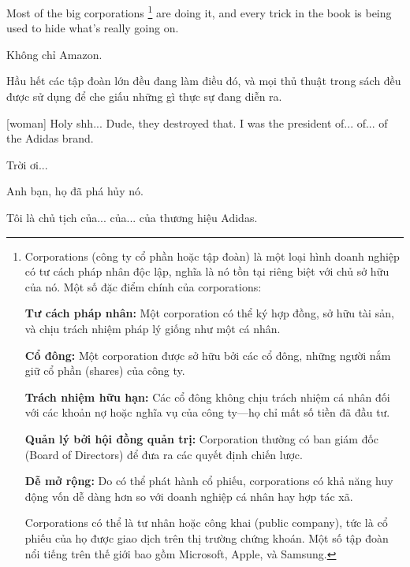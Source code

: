 \documentclass[a4paper]{article}
\begin{document}
	Most of the big corporations  \footnote{
		Corporations (công ty cổ phần hoặc tập đoàn) là một loại hình doanh nghiệp có tư cách pháp nhân độc lập, nghĩa là nó tồn tại riêng biệt với chủ sở hữu của nó. Một số đặc điểm chính của corporations:
		
		\textbf{Tư cách pháp nhân:} Một corporation có thể ký hợp đồng, sở hữu tài sản, và chịu trách nhiệm pháp lý giống như một cá nhân.
		
		\textbf{Cổ đông:} Một corporation được sở hữu bởi các cổ đông, những người nắm giữ cổ phần (shares) của công ty.
		
		\textbf{Trách nhiệm hữu hạn:} Các cổ đông không chịu trách nhiệm cá nhân đối với các khoản nợ hoặc nghĩa vụ của công ty—họ chỉ mất số tiền đã đầu tư.
		
		\textbf{Quản lý bởi hội đồng quản trị:} Corporation thường có ban giám đốc (Board of Directors) để đưa ra các quyết định chiến lược.
		
		\textbf{Dễ mở rộng:} Do có thể phát hành cổ phiếu, corporations có khả năng huy động vốn dễ dàng hơn so với doanh nghiệp cá nhân hay hợp tác xã.
		
		Corporations có thể là tư nhân hoặc công khai (public company), tức là cổ phiếu của họ được giao dịch trên thị trường chứng khoán. Một số tập đoàn nổi tiếng trên thế giới bao gồm Microsoft, Apple, và Samsung.
	
	
	} are doing it, and every trick in the book is being used to hide what's really going on.
	
	\begin{vietnamese-v2}
		Không chỉ Amazon.
		
		Hầu hết các tập đoàn lớn đều đang làm điều đó, và mọi thủ thuật trong sách đều được sử dụng để che giấu những gì thực sự đang diễn ra.
	\end{vietnamese-v2}
	
	[woman] Holy shh...
	Dude, they destroyed that.
	I was the president of... of... of the Adidas brand.
	
	\begin{vietnamese-v2}
		 Trời ơi...
		
		Anh bạn, họ đã phá hủy nó.
		
		Tôi là chủ tịch của... của... của thương hiệu Adidas.
	\end{vietnamese-v2}
	
	\pagebreak
	
\end{document}
